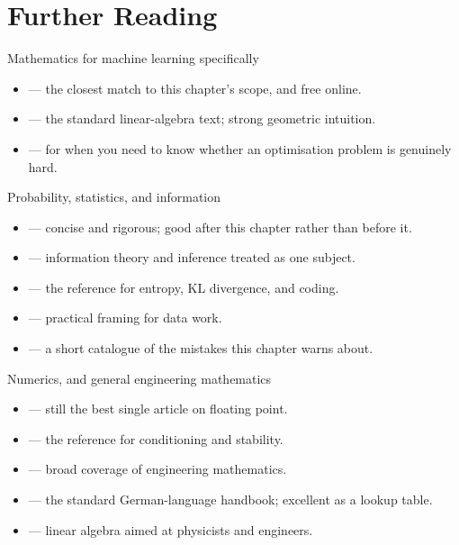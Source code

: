 
\section{Further Reading}

\begin{v3topic}{Mathematics for machine learning specifically}
\begin{itemize}
  \item {} --- the closest
    match to this chapter's scope, and free online.
  \item {} --- the standard
    linear-algebra text; strong geometric intuition.
  \item {} --- for when you need to know
    whether an optimisation problem is genuinely hard.
\end{itemize}
\end{v3topic}

\begin{v3topic}{Probability, statistics, and information}
\begin{itemize}
  \item {} --- concise and rigorous;
    good after this chapter rather than before it.
  \item {} --- information theory
    and inference treated as one subject.
  \item {} --- the reference for
    entropy, KL divergence, and coding.
  \item {} --- practical framing for
    data work.
  \item {} --- a short catalogue of the
    mistakes this chapter warns about.
\end{itemize}
\end{v3topic}

\begin{v3topic}{Numerics, and general engineering mathematics}
\begin{itemize}
  \item {} --- still the best single
    article on floating point.
  \item {} --- the reference for
    conditioning and stability.
  \item {} --- broad coverage of
    engineering mathematics.
  \item {} --- the standard
    German-language handbook; excellent as a lookup table.
  \item {} --- linear algebra aimed at
    physicists and engineers.
\end{itemize}
\end{v3topic}
